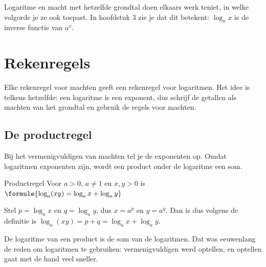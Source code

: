 Logaritme en macht met hetzelfde grondtal doen elkaars werk teniet, in welke volgorde je ze ook toepast. In hoofdstuk 3 zie je dat dit betekent: $\log_a x$ is de inverse functie van $a^x$.


\begin{oefeningen}
\end{oefeningen}

\section{Rekenregels}

Elke rekenregel voor machten geeft een rekenregel voor logaritmen. Het idee is telkens hetzelfde: een logaritme is een exponent, dus schrijf de getallen als machten van het grondtal en gebruik de regels voor machten.

\subsection{De productregel}

Bij het vermenigvuldigen van machten tel je de exponenten op. Omdat logaritmen exponenten zijn, wordt een product onder de logaritme een som.

\begin{theorie}
\begin{stelling}{Productregel}
Voor $a > 0$, $a \neq 1$ en $x, y > 0$ is \qquad $\formule{\log_a (xy) = \log_a x + \log_a y}$
\end{stelling}
\begin{bewijs}
Stel $p = \log_a x$ en $q = \log_a y$, dus $x = a^p$ en $y = a^q$. Dan is
dus volgens de definitie is $\log_a(xy) = p + q = \log_a x + \log_a y$.
\end{bewijs}
\end{theorie}

De logaritme van een product is de som van de logaritmen. Dat was eeuwenlang de reden om logaritmen te gebruiken: vermenigvuldigen werd optellen, en optellen gaat met de hand veel sneller.

